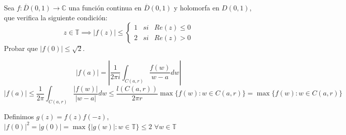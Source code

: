 \begin{ejer}
	Sea $f:\overline{D}(0,1)\rightarrow\mathbb{C}$ una función continua en $\overline{D}(0,1)$ y holomorfa en $D(0,1)$, que verifica la siguiente condición:
	$$ z\in\mathbb{T} \implies |f(z)| \leq \left\{ \begin{array}{lcc}
	1 &  si  & Re(z) \leq 0 \\
	2 &  si  & Re(z) > 0
	\end{array}
	\right. $$
	Probar que $|f(0)| \leq \sqrt{2}$.
\end{ejer}
\begin{sol}
	$$|f(a)| = \left| \frac{1}{2\pi i}\int_{C(a,r)} \frac{f(w)}{w-a} dw \right|$$
	$$|f(a)| \leq \frac{1}{2\pi} \int_{C(a,r)} \frac{|f(w)|}{|w-a|} dw \leq \frac{l(C(a,r))}{2\pi r} \max\{ f(w) : w\in C(a,r) \} = \max\{ f(w) : w\in C(a,r) \} $$
	
	Definimos $g(z) = f(z)f(-z)$, 
	$|f(0)|^2 = |g(0)| = \max\{ |g(w)| : w\in\mathbb{T} \} \leq 2$ $\forall w\in\mathbb{T}$
\end{sol}


